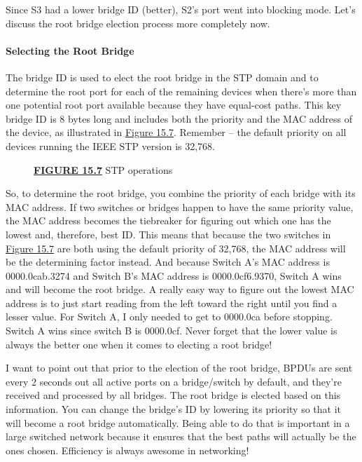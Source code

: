\documentclass[b5paper,11pt]{memoir}
\begin{document}
Since S3 had a lower bridge ID (better), S2's port went into blocking
mode. Let's discuss the root bridge election process more completely
now.

\paragraph{Selecting the Root Bridge}

The bridge ID is used to elect the root bridge in the STP domain and to
determine the root port for each of the remaining devices when there's
more than one potential root port available because they have equal-cost
paths. This key bridge ID is 8 bytes long and includes both the priority
and the MAC address of the device, as illustrated in
\protect\hyperlink{c15.xhtmlux5cux23figure15-7}{Figure 15.7}.
Remember -- the default priority on all devices running the IEEE STP
version is 32,768.

\begin{figure}
\centering
\caption{{\protect\hyperlink{c15.xhtmlux5cux23figureanchor15-7}{\textbf{FIGURE
15.7}} STP operations}}
\end{figure}

So, to determine the root bridge, you combine the priority of each
bridge with its MAC address. If two switches or bridges happen to have
the same priority value, the MAC address becomes the tiebreaker for
figuring out which one has the lowest and, therefore, best ID. This
means that because the two switches in
\protect\hyperlink{c15.xhtmlux5cux23figure15-7}{Figure 15.7} are both
using the default priority of 32,768, the MAC address will be the
determining factor instead. And because Switch A's MAC address is
0000.0cab.3274 and Switch B's MAC address is 0000.0cf6.9370, Switch
A wins and will
become the root bridge. A really easy way to figure out the lowest MAC
address is to just start reading from the left toward the right until
you find a lesser value. For Switch A, I only needed to get to 0000.0ca
before stopping. Switch A wins since switch B is 0000.0cf. Never forget
that the lower value is always the better one when it comes to electing
a root bridge!

I want to point out that prior to the election of the root bridge, BPDUs
are sent every 2 seconds out all active ports on a bridge/switch by
default, and they're received and processed by all bridges. The root
bridge is elected based on this information. You can change the bridge's
ID by lowering its priority so that it will become a root bridge
automatically. Being able to do that is important in a large switched
network because it ensures that the best paths will actually be the ones
chosen. Efficiency is always awesome in networking!
\end{document}

